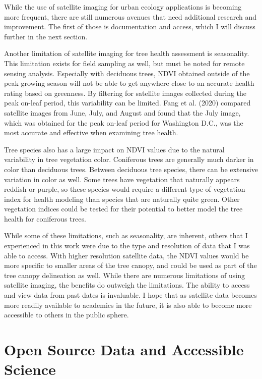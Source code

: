 \documentclass[12pt,twoside]{reedthesis}
\begin{document}
While the use of satellite imaging for urban ecology applications is
becoming more frequent, there are still numerous avenues that need
additional research and improvement. The first of those is documentation
and access, which I will discuss further in the next section.

Another limitation of satellite imaging for tree health assessment is
seasonality. This limitation exists for field sampling as well, but must
be noted for remote sensing analysis. Especially with deciduous trees,
NDVI obtained outside of the peak growing season will not be able to get
anywhere close to an accurate health rating based on greenness. By
filtering for satellite images collected during the peak on-leaf period,
this variability can be limited. Fang et al. (2020) compared satellite images
from June, July, and August and found that the July image, which was
obtained for the peak on-leaf period for Washington D.C., was the most
accurate and effective when examining tree health.

Tree species also has a large impact on NDVI values due to the natural
variability in tree vegetation color. Coniferous trees are generally
much darker in color than deciduous trees. Between deciduous tree
species, there can be extensive variation in color as well. Some trees
have vegetation that naturally appears reddish or purple, so these
species would require a different type of vegetation index for health
modeling than species that are naturally quite green. Other vegetation
indices could be tested for their potential to better model the tree
health for coniferous trees.

While some of these limitations, such as seasonality, are inherent,
others that I experienced in this work were due to the type and
resolution of data that I was able to access. With higher resolution
satellite data, the NDVI values would be more specific to smaller areas
of the tree canopy, and could be used as part of the tree canopy
delineation as well. While there are numerous limitations of using
satellite imaging, the benefits do outweigh the limitations. The ability
to access and view data from past dates is invaluable. I hope that as
satellite data becomes more readily available to academics in the
future, it is also able to become more accessible to others in the
public sphere.

\hypertarget{open-source-data-and-accessible-science}{%
\section{Open Source Data and Accessible Science}\label{open-source-data-and-accessible-science}}
\end{document}
